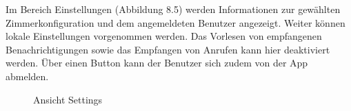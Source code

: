 Im Bereich Einstellungen (Abbildung 8.5) werden Informationen zur gewählten Zimmerkonfiguration und dem angemeldeten Benutzer angezeigt.
Weiter können lokale Einstellungen vorgenommen werden.
Das Vorlesen von empfangenen Benachrichtigungen sowie das Empfangen von Anrufen kann hier deaktiviert werden.
Über einen Button kann der Benutzer sich zudem von der App abmelden.

\begin{figure}[h]
    \centering
    \begin{minipage}[b]{0.45\textwidth}
        \caption{Ansicht Settings}
    \end{minipage}
    \hfill
    \begin{minipage}[b]{0.45\textwidth}

\end{minipage}
\end{figure}

